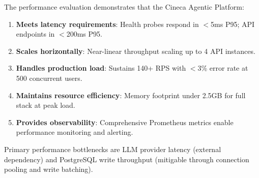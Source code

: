 The performance evaluation demonstrates that the Cineca Agentic Platform:

\begin{enumerate}
    \item \textbf{Meets latency requirements}: Health probes respond in $<$5ms P95; API endpoints in $<$200ms P95.
    
    \item \textbf{Scales horizontally}: Near-linear throughput scaling up to 4 API instances.
    
    \item \textbf{Handles production load}: Sustains 140+ RPS with $<$3\% error rate at 500 concurrent users.
    
    \item \textbf{Maintains resource efficiency}: Memory footprint under 2.5GB for full stack at peak load.
    
    \item \textbf{Provides observability}: Comprehensive Prometheus metrics enable performance monitoring and alerting.
\end{enumerate}

Primary performance bottlenecks are LLM provider latency (external dependency) and PostgreSQL write throughput (mitigable through connection pooling and write batching).

